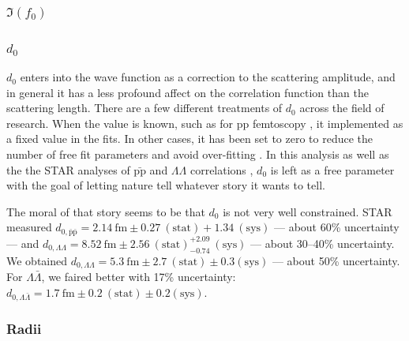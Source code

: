 




\subsubsection{$\Im(f_0)$}
\label{Imf0Result}






\subsubsection{$d_0$}

$d_0$ enters into the wave function as a correction to the scattering amplitude, and in general it has a less profound affect on the correlation function than the scattering length.
There are a few different treatments of $d_0$ across the field of research.
When the value is known, such as for pp femtoscopy \cite{Adam:2015vja}, it implemented as a fixed value in the fits.
In other cases, it has been set to zero to reduce the number of free fit parameters and avoid over-fitting \cite{Kisiel:2014mma, Shapoval:2014yha, Adams:2005ws}.
In this analysis as well as the the STAR analyses of $\bar{\mathrm{pp}}$ and $\Lambda\Lambda$ correlations \cite{Adamczyk:2015hza, Adamczyk:2014vca}, $d_0$ is left as a free parameter with the goal of letting nature tell whatever story it wants to tell.

The moral of that story seems to be that $d_0$ is not very well constrained. 
STAR measured $d_{0,\bar{\mathrm{p}}\bar{\mathrm{p}}} = 2.14\ \mathrm{fm} \pm 0.27\ \mathrm{(stat)} + 1.34\ \mathrm{(sys)}$ --- about 60\% uncertainty --- and $d_{0,\Lambda\Lambda} =  8.52\ \mathrm{fm} \pm 2.56\ \mathrm{(stat)}^{+2.09}_{-0.74}\ \mathrm{(sys)}$ --- about 30--40\% uncertainty.
We obtained $d_{0,\Lambda\Lambda} =  5.3\ \mathrm{fm} \pm 2.7\ \mathrm{(stat)} \pm 0.3 \mathrm{(sys)}$ --- about 50\% uncertainty.
For $\Lambda\bar{\Lambda}$, we faired better with 17\% uncertainty: $d_{0,\Lambda\bar{\Lambda}} =  1.7\ \mathrm{fm} \pm 0.2\ \mathrm{(stat)} \pm 0.2 \mathrm{(sys)}$.






\subsubsection{Radii}




